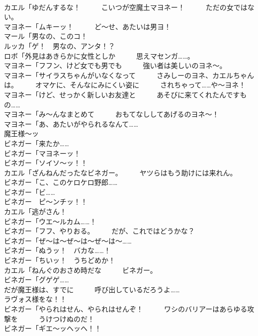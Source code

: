 \documentclass[8pt]{extreport}
\begin{document}
\begin{CJK}{UTF8}{min}
\\	カエル「ゆだんするな！　　　こいつが空魔土マヨネー！　　　ただの女ではない。	
\\	マヨネー「ムキーッ！　　　ど～せ、あたいは男ヨ！	
\\	マール「男なの、このコ！	
\\	ルッカ「ゲ！　男なの、アンタ！？	
\\	ロボ「外見はあきらかに女性としか　　　思えマセンガ……。	
\\	マヨネー「フフン、けど女でも男でも　　　強い者は美しいのヨネ～。	
\\	マヨネー「サイラスちゃんがいなくなって　　　さみしーのヨネ、カエルちゃんは。　　　オマケに、そんなにみにくい姿に　　　されちゃって……や～ヨネ！	
\\	マヨネー「けど、せっかく新しいお友達と　　　あそびに来てくれたんですもの……	
\\	マヨネー「み～んなまとめて　　　おもてなししてあげるのヨネ～！	
\\	マヨネー「あ、あたいがやられるなんて……	
\\	魔王様～ッ
\\	ビネガー「来たか……	
\\	ビネガー「マヨネーッ！	
\\	ビネガー「ソイソ～ッ！！	
\\	カエル「ざんねんだったなビネガー。　　　ヤツらはもう助けには来れん。	
\\	ビネガー「こ、このケロケロ野郎……	
\\	ビネガー「ビ……	
\\	ビネガー　ピ～ンチッ！！	
\\	カエル「逃がさん！	
\\	ビネガー「ウエ～ルカム……！	
\\	ビネガー「フフ、やりおる。　　　だが、これではどうかな？	
\\	ビネガー「ぜ～は～ぜ～は～ぜ～は～……	
\\	ビネガー「ぬうッ！　バカな……！	
\\	ビネガー「ちいッ！　うちどめか！	
\\	カエル「ねんぐのおさめ時だな　　　ビネガー。	
\\	ビネガー「グゲゲ……	
\\	だが魔王様は、すでに　　　呼び出しているだろうよ……	
\\	ラヴォス様をな！！	
\\	ビネガー「やられはせん、やられはせんぞ！　　　ワシのバリアーはあらゆる攻撃を　　　うけつけぬのだ！	
\\	ビネガー「ギエ～ッヘッヘ！！	

\end{CJK}
\end{document}
